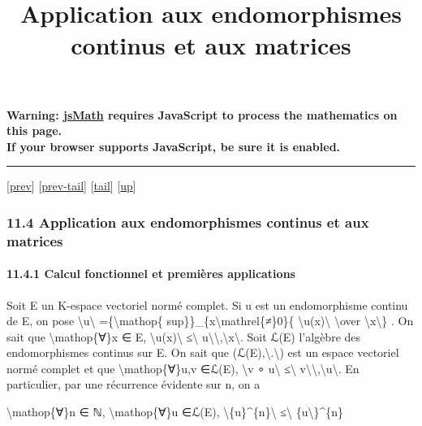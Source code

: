 \documentclass[]{article}
\title{Application aux endomorphismes continus et aux matrices}
\author{}
\date{}
\begin{document}
\maketitle

\textbf{Warning: \href{http://www.math.union.edu/locate/jsMath}{jsMath}
requires JavaScript to process the mathematics on this page.\\ If your
browser supports JavaScript, be sure it is enabled.}

\begin{center}\rule{3in}{0.4pt}\end{center}

{[}\href{coursse65.html}{prev}{]}
{[}\href{coursse65.html\#tailcoursse65.html}{prev-tail}{]}
{[}\hyperref[tailcoursse66.html]{tail}{]}
{[}\href{coursch12.html\#coursse66.html}{up}{]}

\subsubsection{11.4 Application aux endomorphismes continus et aux
matrices}

\paragraph{11.4.1 Calcul fonctionnel et premières applications}

Soit E un K-espace vectoriel normé complet. Si u est un endomorphisme
continu de E, on pose
\textbackslash{}\textbar{}u\textbackslash{}\textbar{}
=\{\textbackslash{}mathop\{
sup\}\}\_\{x\textbackslash{}mathrel\{≠\}0\}\{
\textbackslash{}\textbar{}u(x)\textbackslash{}\textbar{}
\textbackslash{}over
\textbackslash{}\textbar{}x\textbackslash{}\textbar{}\} . On sait que
\textbackslash{}mathop\{∀\}x ∈ E,
\textbackslash{}\textbar{}u(x)\textbackslash{}\textbar{}
≤\textbackslash{}\textbar{}
u\textbackslash{}\textbar{}\textbackslash{},\textbackslash{}\textbar{}x\textbackslash{}\textbar{}.
Soit ℒ(E) l'algèbre des endomorphismes continus sur E. On sait que
(ℒ(E),\textbackslash{}\textbar{}.\textbackslash{}\textbar{}) est un
espace vectoriel normé complet et que \textbackslash{}mathop\{∀\}u,v
∈ℒ(E), \textbackslash{}\textbar{}v ∘ u\textbackslash{}\textbar{}
≤\textbackslash{}\textbar{}
v\textbackslash{}\textbar{}\textbackslash{},\textbackslash{}\textbar{}u\textbackslash{}\textbar{}.
En particulier, par une récurrence évidente sur n, on a

\textbackslash{}mathop\{∀\}n ∈ ℕ, \textbackslash{}mathop\{∀\}u ∈ℒ(E),
\textbackslash{}\textbar{}\{u\}\^{}\{n\}\textbackslash{}\textbar{}
≤\textbackslash{}\textbar{} \{u\textbackslash{}\textbar{}\}\^{}\{n\}
\end{document}

